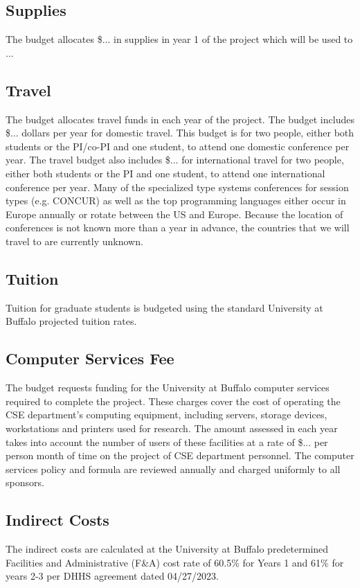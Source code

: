 \subsection*{Supplies}
The budget allocates \$... in supplies in year 1 of the project which will be used to ...

\subsection*{Travel}
The budget allocates travel funds in each year of the project. 
The budget includes \$... dollars per year for domestic travel.
This budget is for two people, either both students or the PI/co-PI and one student, to attend one domestic conference per year.
The travel budget also includes \$... for international travel for two people, either both students or the PI and one student, to attend one international conference per year.
Many of the specialized type systems conferences for session types (e.g. CONCUR) as well as the top programming languages either occur in Europe annually or rotate between the US and Europe.  
Because the location of conferences is not known more than a year in advance, the countries that we will travel to are currently unknown.

\subsection*{Tuition}
Tuition for graduate students is budgeted using the standard University at Buffalo projected tuition rates.

\subsection*{Computer Services Fee}
The budget requests funding for the University at Buffalo computer services required to complete the project.
These charges cover the cost of operating the CSE department's computing equipment, including servers, storage devices, workstations and printers used for research.
The amount assessed in each year takes into account the number of users of these facilities at a rate of \$... per person month of time on the project of CSE department personnel.
The computer services policy and formula are reviewed annually and charged uniformly to all sponsors. 

\subsection*{Indirect Costs}

The indirect costs are calculated at the University at Buffalo predetermined Facilities and Administrative (F\&A) cost rate of 60.5\% for Years 1 and 61\% for years 2-3 per DHHS agreement dated 04/27/2023.



